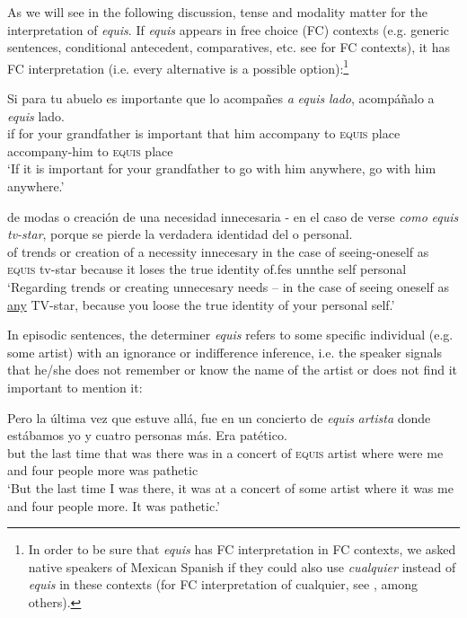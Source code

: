 \documentclass[output=paper
,modfonts
,nonflat]{langsci/langscibook}
\begin{document}
As we will see in the following discussion, tense and modality matter for the interpretation of \textit{equis}. If \textit{equis} appears in free choice (FC) contexts (e.g. generic sentences, conditional antecedent, comparatives, etc. see \citealt{Aloni2010} for FC contexts), it has FC interpretation (i.e. every alternative is a possible option):\footnote{In order to be sure that \textit{equis} has FC interpretation in FC contexts, we asked native speakers of Mexican Spanish if they could also use \textit{cualquier} instead of \textit{equis} in these contexts (for FC interpretation of cualquier, see \citealt{AM2011}, among others).}

\ea
\gll Si para tu abuelo es importante que lo acompañes \textit{a} \textit{equis} \textit{lado}, acompáñalo a \textit{equis} lado.\\
if for your grandfather is important that him accompany to \textsc{equis} place accompany-him to \textsc{equis} place\\
\glt ‘If it is important for your grandfather to go with him anywhere, go with him anywhere.’
\z

\ea
\gll de modas o creación de una necesidad innecesaria - en el caso de verse \textit{como} \textit{equis} \textit{tv-star}, porque se pierde la verdadera identidad del o personal.\\
of trends or creation of a necessity innecesary {} in the case of seeing-oneself as \textsc{equis} tv-star because it	loses the true identity of.fes unnthe self personal\\
\glt ‘Regarding trends or creating unnecesary needs – in the case of seeing oneself as \underline{any} TV-star, because you loose the true identity of your personal self.’
\z

In episodic sentences, the determiner \textit{equis} refers to some specific individual (e.g. some artist) with an ignorance or indifference inference, i.e. the speaker signals that he/she does not remember or know the name of the artist or does not find it important to mention it:

\ea
\gll  Pero la última vez que estuve allá, fue en un concierto de \textit{equis} \textit{artista} donde estábamos yo y cuatro personas más. Era patético.\\
but the last time that was there was in a concert of \textsc{equis} artist where were me and four people more was pathetic
\\
\glt ‘But the last time I was there, it was at a concert of some artist where it was me and four people more. It was pathetic.’
\z
\end{document}
